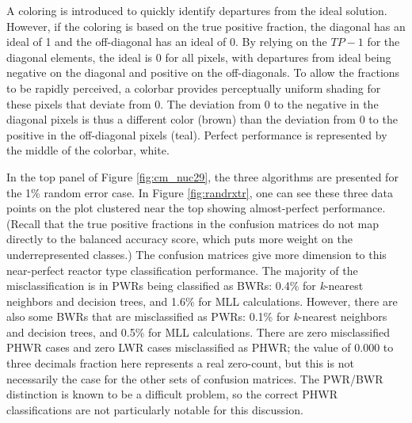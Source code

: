 A coloring is introduced to quickly identify departures from the ideal
solution. However, if the coloring is based on the true positive fraction, the
diagonal has an ideal of 1 and the off-diagonal has an ideal of 0.  By relying
on the $TP - 1$ for the diagonal elements, the ideal is 0 for all pixels, with
departures from ideal being negative on the diagonal and positive on the
off-diagonals.  To allow the fractions to be rapidly perceived, a colorbar
provides perceptually uniform shading for these pixels that deviate from 0.
The deviation from 0 to the negative in the diagonal pixels is thus a different
color (brown) than the deviation from 0 to the positive in the off-diagonal
pixels (teal).  Perfect performance is represented by the middle of the
colorbar, white.  

In the top panel of Figure \ref{fig:cm_nuc29}, the three algorithms are
presented for the 1\% random error case. In Figure \ref{fig:randrxtr}, one can
see these three data points on the plot clustered near the top showing
almost-perfect performance.  (Recall that the true positive fractions in the
confusion matrices do not map directly to the balanced accuracy score, which
puts more weight on the underrepresented classes.) The confusion matrices give
more dimension to this near-perfect reactor type classification performance.
The majority of the misclassification is in \glspl{PWR} being classified as
\glspl{BWR}: 0.4\% for \textit{k}-nearest neighbors and decision trees, and
1.6\% for \gls{MLL} calculations. However, there are also some \glspl{BWR} that
are misclassified as \glspl{PWR}: 0.1\% for \textit{k}-nearest neighbors and
decision trees, and 0.5\% for \gls{MLL} calculations.  There are zero
misclassified \gls{PHWR} cases and zero \gls{LWR} cases misclassified as
\gls{PHWR}; the value of 0.000 to three decimals fraction here represents a
real zero-count, but this is not necessarily the case for the other sets of
confusion matrices.  The \gls{PWR}/\gls{BWR} distinction is known to be a
difficult problem\cite{pu_discrimination}, so the correct \gls{PHWR}
classifications are not particularly notable for this discussion. 


